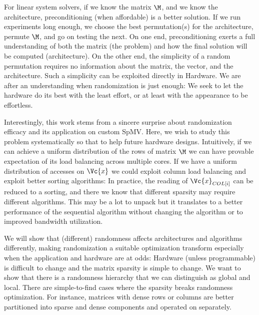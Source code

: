 \documentclass[manuscript,screen]{acmart}
\begin{document}
For linear system solvers, if we know the matrix $\M$, and we know the
architecture, preconditioning (when affordable) is a better solution.
If we run experiments long enough, we choose the best permutation(s)
for the architecture, permute $\M$, and go on testing the next.  On
one end, preconditioning exerts a full understanding of both the
matrix (the problem) and how the final solution will be computed
(architecture).  On the other end, the simplicity of a random
permutation requires no information about the matrix, the vector, and
the architecture. Such a simplicity can be exploited directly in
Hardware. We are after an understanding when randomization is just
enough: We seek to let the hardware do its best with the least effort,
or at least with the appearance to be effortless.


Interestingly, this work stems from a sincere surprise about
randomization efficacy and its application on custom SpMV. Here, we
wish to study this problem systematically so that to help future
hardware designs. Intuitively, if we can achieve a uniform
distribution of the rows of matrix $\M$ we can have provable
expectation of its load balancing across multiple cores. If we have a
uniform distribution of accesses on $\Vc{x}$ we could exploit column
load balancing and exploit better sorting algorithms: In practice, the
reading of $\Vc{x}_{COL[i]}$ can be reduced to a sorting, and there we know
that different sparsity  may require different algorithms. This may be 
a lot to unpack but it translates to a better performance of the
sequential algorithm without changing the algorithm or to improved bandwidth
utilization.


We will show that (different) randomness affects architectures and
algorithms differently, making randomization a suitable optimization
transform especially when the application and hardware are at odds:
Hardware (unless programmable) is difficult to change and the matrix
sparsity is simple to change. We want to show that there is a
randomness hierarchy that we can distinguish as global and
local. There are simple-to-find cases where the sparsity breaks
randomness optimization.  For instance, matrices with dense rows or
columns are better partitioned into sparse and dense components and
operated on separately.
\newpage 
{}
\end{document}
